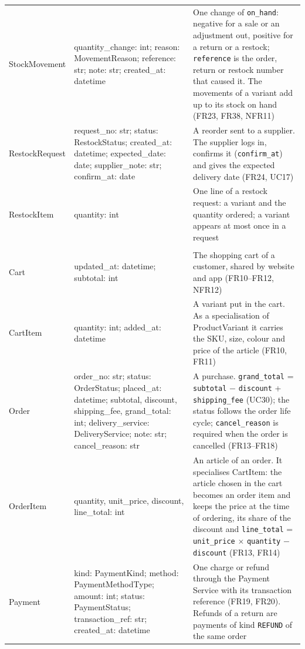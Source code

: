 {\begin{xltabular}{\textwidth}{@{}L{3.0cm} L{4.8cm} Y@{}}
\textsf{StockMovement} & quantity\_change: int; reason: MovementReason; reference: str; note: str; created\_at: datetime & One change of \texttt{on\_hand}: negative for a sale or an adjustment out, positive for a return or a restock; \texttt{reference} is the order, return or restock number that caused it. The movements of a variant add up to its stock on hand (FR23, FR38, NFR11) \\
\textsf{RestockRequest} & request\_no: str; status: RestockStatus; created\_at: datetime; expected\_date: date; supplier\_note: str; confirm\_at: date & A reorder sent to a supplier. The supplier logs in, confirms it (\texttt{confirm\_at}) and gives the expected delivery date (FR24, UC17) \\
\textsf{RestockItem} & quantity: int & One line of a restock request: a variant and the quantity ordered; a variant appears at most once in a request \\ \addlinespace
{} \\
\textsf{Cart} & updated\_at: datetime; subtotal: int & The shopping cart of a customer, shared by website and app (FR10--FR12, NFR12) \\
\textsf{CartItem} & quantity: int; added\_at: datetime & A variant put in the cart. As a specialisation of \textsf{ProductVariant} it carries the SKU, size, colour and price of the article (FR10, FR11) \\
\textsf{Order} & order\_no: str; status: OrderStatus; placed\_at: datetime; subtotal, discount, shipping\_fee, grand\_total: int; delivery\_service: DeliveryService; note: str; cancel\_reason: str & A purchase. \texttt{grand\_total} = \texttt{subtotal} $-$ \texttt{discount} + \texttt{shipping\_fee} (UC30); the status follows the order life cycle; \texttt{cancel\_reason} is required when the order is cancelled (FR13--FR18) \\
\textsf{OrderItem} & quantity, unit\_price, discount, line\_total: int & An article of an order. It specialises \textsf{CartItem}: the article chosen in the cart becomes an order item and keeps the price at the time of ordering, its share of the discount and \texttt{line\_total} = \texttt{unit\_price} $\times$ \texttt{quantity} $-$ \texttt{discount} (FR13, FR14) \\
\textsf{Payment} & kind: PaymentKind; method: PaymentMethodType; amount: int; status: PaymentStatus; transaction\_ref: str; created\_at: datetime & One charge or refund through the Payment Service with its transaction reference (FR19, FR20). Refunds of a return are payments of kind \texttt{REFUND} of the same order \\

\end{xltabular}}
